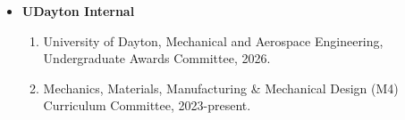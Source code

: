 \documentclass[11pt, letterpaper]{article}
\begin{document}
\begin{itemize}
\begin{enumerate}
            \item Engineering Research Express
            \item Nondestructive Testing and Evaluation
            \item IEEE Industrial Electronics Society
            \item IEEE Access
            \item IEEE Industrial Informatics
            \item IEEE Reliability Society
            \item International Journal of Mechanical Sciences
            \item Journal of Industrial Information Integration
            \item Journal of Materials Engineering and Performance
            \item Qeios
            \item Results in Engineering
            \item Scientific Reports
            \item SME Journal of Manufacturing Processes
            \item Superconductor Science and Technology
            \item International Journal of Computer Integrated Manufacturing
            \item Digital Twin
            \item Materials Technology
        \end{enumerate}

        \item \textbf{UDayton Internal}
        \begin{enumerate}
            \item University of Dayton, Mechanical and Aerospace Engineering, Undergraduate Awards Committee, 2026.
            \item Mechanics, Materials, Manufacturing \& Mechanical Design (M4) Curriculum Committee, 2023-present.
        \end{enumerate}
    \end{itemize}
\end{document}
